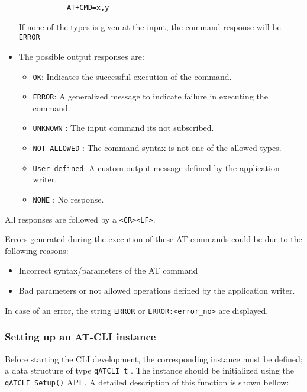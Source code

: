\begin{itemize}
\begin{itemize}
        \begin{lstlisting}
        AT+CMD=x,y
        \end{lstlisting}
    \end{itemize}
    If none of the types is given at the input, the command response will be \lstinline{ERROR}
    \item The possible output responses are:
    \begin{itemize}
        \item \lstinline{OK}: Indicates the successful execution of the command.
        \item \lstinline{ERROR}: A generalized message to indicate failure in executing the command. 
        \item \lstinline{UNKNOWN} : The input command its not subscribed.
        \item \lstinline{NOT ALLOWED} : The command syntax is not one of the allowed types.
        \item \lstinline{User-defined}: A custom output message defined by the application writer.
        \item \lstinline{NONE} : No response.
    \end{itemize}
\end{itemize}

All responses are followed by a \lstinline{<CR><LF>}.
\medskip

Errors generated during the execution of these AT commands could be due to the following reasons:
\begin{itemize}
    \item Incorrect syntax/parameters of the AT command
    \item Bad parameters or not allowed operations defined by the application writer.
\end{itemize}

In case of an error, the string \lstinline{ERROR} or \lstinline{ERROR:<error_no>} are displayed.

\subsubsection{Setting up an AT-CLI instance}
Before starting the CLI development, the corresponding instance must be defined; a data structure of type \lstinline{qATCLI_t} . 
The instance should be initialized using the \lstinline{qATCLI_Setup()} API . A detailed description of this function is shown bellow:
\medskip


